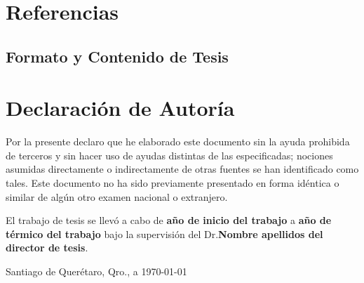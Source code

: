 \documentclass[12pt,letterpaper,spanish,twoside,openright]{report}
\begin{document}
\chapter{Referencias}

\nocite{*}
\printbibliography[heading=none]



\begin{appendices}
\chapter{Formato y Contenido de Tesis}

\end{appendices}

\cleardoublepage
\chapter*{Declaración de Autoría}
Por la presente declaro que he elaborado este documento sin la ayuda prohibida de terceros y sin hacer uso de ayudas distintas de las especificadas; nociones asumidas directamente o indirectamente de otras fuentes se han identificado como tales. Este documento no ha sido previamente presentado en forma idéntica o similar de algún otro examen nacional o extranjero.

\vspace{3cm}
El trabajo de tesis se llevó a cabo de \textbf{año de inicio del trabajo} a \textbf{año de térmico del trabajo} bajo la supervisión del Dr.\textbf{Nombre apellidos del director de tesis}.


\vspace{3cm}

\begin{flushright}
Santiago de Querétaro, Qro., a \today
\end{flushright}
\end{document}
